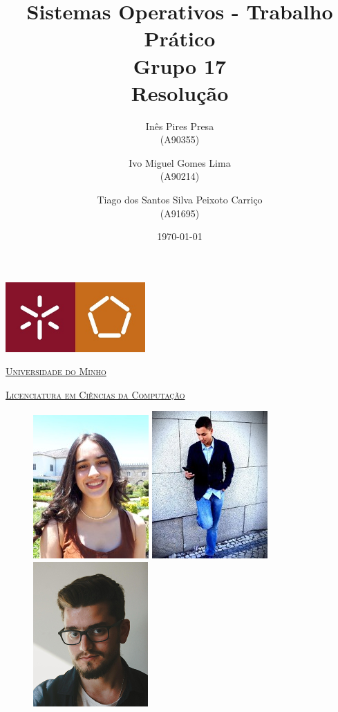 \documentclass[11pt,a4paper]{report}
\title{Sistemas Operativos - Trabalho Prático\\
       \textbf{Grupo 17}\\ Resolução
       } %
\author{Inês Pires Presa\\ (A90355)\and Ivo Miguel Gomes Lima\\ (A90214)\and Tiago dos Santos Silva Peixoto Carriço \\ (A91695)
       } %
\date{\today} %
\begin{document}
	\begin{minipage}{0.9\linewidth}
        \centering
		\includegraphics[width=0.4\textwidth]{um.jpeg}\par\vspace{1cm}
                \href{https://www.uminho.pt/PT}
		{\scshape\LARGE Universidade do Minho} \par
		\vspace{0.6cm}
                \href{https://lcc.di.uminho.pt}
		{\scshape\Large Licenciatura em Ciências da Computação} \par
		\maketitle
		\begin{figure}[H]
			\includegraphics[width=0.32\linewidth]{ines.jpg}
			\includegraphics[width=0.32\linewidth]{ivo.jpg}
			\includegraphics[width=0.32\linewidth]{tiago.jpg}
		\end{figure}
	\end{minipage}
\end{document}
